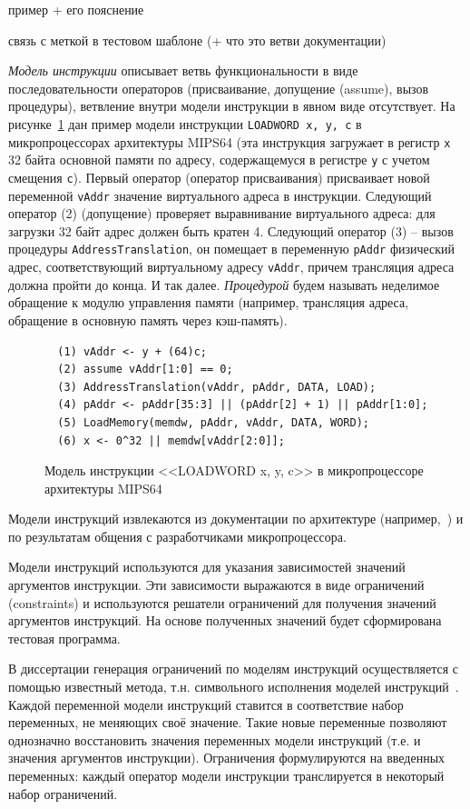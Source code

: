 пример + его пояснение

связь с меткой в тестовом шаблоне (+ что это ветви документации)

\emph{Модель инструкции} описывает ветвь функциональности в виде
последовательности операторов (присваивание, допущение (assume),
вызов процедуры), ветвление внутри модели инструкции в явном виде
отсутствует. На рисунке~\ref{inst_model_example} дан пример модели
инструкции \texttt{LOADWORD x, y, c} в микропроцессорах архитектуры
\textsc{MIPS64} (эта инструкция загружает в регистр \texttt{x} 32
байта основной памяти по адресу, содержащемуся в регистре \texttt{y}
с учетом смещения \texttt{c}). Первый оператор (оператор
присваивания) присваивает новой переменной \texttt{vAddr} значение
виртуального адреса в инструкции. Следующий оператор (2) (допущение)
проверяет выравнивание виртуального адреса: для загрузки 32 байт
адрес должен быть кратен 4. Следующий оператор (3) -- вызов
процедуры \texttt{AddressTranslation}, он помещает в переменную
\texttt{pAddr} физический адрес, соответствующий виртуальному адресу
\texttt{vAddr}, причем трансляция адреса должна пройти до конца. И
так далее. \emph{Процедурой} будем называть неделимое обращение к
модулю управления памяти (например, трансляция адреса, обращение в
основную память через кэш-память).

\begin{figure}[h]\center
\begin{verbatim}
  (1) vAddr <- y + (64)c;
  (2) assume vAddr[1:0] == 0;
  (3) AddressTranslation(vAddr, pAddr, DATA, LOAD);
  (4) pAddr <- pAddr[35:3] || (pAddr[2] + 1) || pAddr[1:0];
  (5) LoadMemory(memdw, pAddr, vAddr, DATA, WORD);
  (6) x <- 0^32 || memdw[vAddr[2:0]];
\end{verbatim}
\caption{Модель инструкции <<LOADWORD x, y, c>> в микропроцессоре
архитектуры MIPS64}\label{inst_model_example}
\end{figure}

Модели инструкций извлекаются из документации по архитектуре
(например,~\cite{mips64_II}) и по результатам общения с
разработчиками микропроцессора.

Модели инструкций используются для указания зависимостей значений
аргументов инструкции. Эти зависимости выражаются в виде ограничений
(constraints) и используются решатели ограничений для получения
значений аргументов инструкций. На основе полученных значений будет
сформирована тестовая программа.

В диссертации генерация ограничений по моделям инструкций
осуществляется с помощью известный метода, т.н. символьного
исполнения моделей инструкций~\cite{my_syrcose_2008}. Каждой
переменной модели инструкций ставится в соответствие набор
переменных, не меняющих своё значение. Такие новые переменные
позволяют однозначно восстановить значения переменных модели
инструкций (т.е. и значения аргументов инструкции). Ограничения
формулируются на введенных переменных: каждый оператор модели
инструкции транслируется в некоторый набор ограничений.

